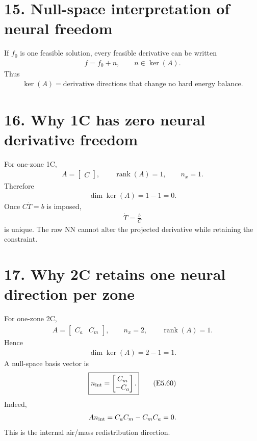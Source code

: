 \documentclass[11pt]{article}
\begin{document}
\section*{15. Null-space interpretation of neural freedom}

If \(f_0\) is one feasible solution, every feasible derivative can be written
\begin{align}
\boxed{f=f_0+n,\qquad n\in\ker(A).}
\tag{E5.55}
\end{align}
Thus
\begin{align}
\boxed{\ker(A)=\text{derivative directions that change no hard energy balance}.}
\tag{E5.56}
\end{align}

\section*{16. Why 1C has zero neural derivative freedom}

For one-zone 1C,
\begin{align}
A=\begin{bmatrix}C\end{bmatrix},\qquad \operatorname{rank}(A)=1,\qquad n_x=1.
\end{align}
Therefore
\begin{align}
\boxed{\dim\ker(A)=1-1=0.}
\tag{E5.57}
\end{align}
Once \(C\dot T=b\) is imposed,
\begin{align}
\boxed{\dot T=\frac{b}{C}}
\tag{E5.58}
\end{align}
is unique. The raw NN cannot alter the projected derivative while retaining the constraint.

\section*{17. Why 2C retains one neural direction per zone}

For one-zone 2C,
\begin{align}
A=\begin{bmatrix}C_a&C_m\end{bmatrix},\qquad n_x=2,\qquad \operatorname{rank}(A)=1.
\end{align}
Hence
\begin{align}
\boxed{\dim\ker(A)=2-1=1.}
\tag{E5.59}
\end{align}
A null-space basis vector is
\begin{align}
\boxed{n_{\rm int}=\begin{bmatrix}C_m\\-C_a\end{bmatrix}.}
\tag{E5.60}
\end{align}
Indeed,
\begin{align}
An_{\rm int}=C_aC_m-C_mC_a=0.
\end{align}
This is the internal air/mass redistribution direction.
\end{document}
